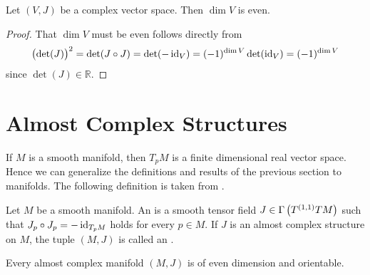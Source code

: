 \begin{lemma}
Let $(V,J)$ be a complex vector space. Then $\dim V$ is even.
\label{lem:complex_vec}
\end{lemma}

\begin{proof}
That $\dim V$ must be even follows directly from
\begin{equation*}
\del[1]{\det(J)}^2 = \det(J \circ J) = \det(-\id_V) = (-1)^{\dim V} \det(\id_V) = (-1)^{\dim V}
\end{equation*} 
\noindent since $\det(J) \in \mathbb{R}$.
\end{proof}

\section{Almost Complex Structures}
If $M$ is a smooth manifold, then $T_pM$ is a finite dimensional real vector space. Hence we can generalize the definitions and results of the previous section to manifolds. The following definition is taken from \cite[86]{cannas:symplectic_geometry:2008}.
\begin{definition}
Let $M$ be a smooth manifold. An  is a smooth tensor field $J \in \Gamma\del[1]{T^{(1,1)}TM}$ such that $J_p \circ J_p = -\operatorname{id}_{T_pM}$ holds for every $p \in M$. If $J$ is an almost complex structure on $M$, the tuple $(M,J)$ is called an .
\end{definition}

\begin{proposition}
Every almost complex manifold $(M,J)$ is of even dimension and orientable.
\label{prop:almost_comp}
\end{proposition}

